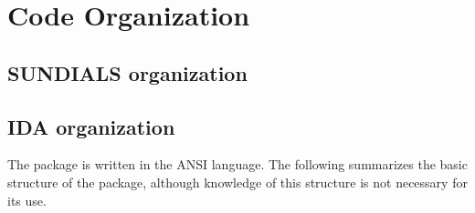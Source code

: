 \chapter{Code Organization}\label{s:organization}

\section{SUNDIALS organization}\label{ss:sun_org}


\section{IDA organization}\label{ss:ida_org}

The {\ida} package is written in the ANSI {\CC} language. The following
summarizes the basic structure of the package, although knowledge
of this structure is not necessary for its use.

